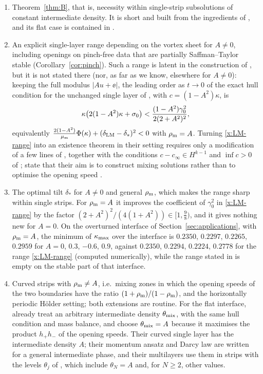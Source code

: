 \begin{enumerate}[label=\textup{(\roman*)},leftmargin=*]
\item Theorem~\ref{thm:B}, that is, necessity within single-strip subsolutions of constant intermediate density. It is short and built from the ingredients of \cite{LM26}, and its flat case is
contained in \cite[Sec.~3.2]{LM26}.
\item An explicit single-layer range depending on the vortex sheet for $A\ne0$, including openings on pinch-free data that are partially Saffman--Taylor stable (Corollary~\ref{cor:pinch}). Such a range is
latent in the construction of \cite{LM26}, but it is not stated there (nor, as far as we know, elsewhere for $A\ne0$): keeping the full modulus $|Au+\ee|$, the leading order as $t\to0$ of the
exact hull condition \cite[(4.14)]{LM26} for the unchanged single layer of \cite{LM26}, with $c=(1-A^2)\kappa$, is
\begin{equation}\label{x:LM-range}
\kappa\big(2(1-A^2)\kappa+\sigma_0\big)<\frac{(1-A^2)\gamma_0^2}{2(2+A^2)^2},
\end{equation}
equivalently $\frac{2(1-A^2)}{\mu_{\mathrm m}}\Phi(\kappa)+(\delta_{\rm LM}-\delta_*)^2<0$ with $\rho_{\mathrm m}=A$. Turning \eqref{x:LM-range} into an existence theorem in their setting requires only a modification of a few lines of
\cite[Sec.~7.4]{LM26}, together with the conditions $c-c_\infty\in H^{k-1}$ and $\inf c>0$ of \cite[Secs.~4.1 and~5]{LM26}; \cite{LM26} state that their aim is to construct mixing solutions rather than
to optimise the opening speed \cite[Sec.~7.5]{LM26}.
\item The optimal tilt $\delta_*$ for $A\ne0$ and general $\rho_{\mathrm m}$, which makes the range sharp within single strips. For $\rho_{\mathrm m}=A$ it improves the coefficient of $\gamma_0^2$ in \eqref{x:LM-range} by the
factor $(2+A^2)^2/(4(1+A^2))\in[1,\frac98)$, and it gives nothing new for $A=0$. On the overturned interface of Section~\ref{sec:applications}, with $\rho_{\mathrm m}=A$, the minimum of $\kappa_{\max}$ over the interface is
$0.2350$, $0.2297$, $0.2265$, $0.2959$ for $A=0$, $0.3$, $-0.6$, $0.9$, against $0.2350$, $0.2294$, $0.2224$, $0.2778$ for the range \eqref{x:LM-range} (computed numerically), while the range stated in
\cite{LM26} is empty on the stable part of that interface.
\item Curved strips with $\rho_{\mathrm m}\ne A$, i.e.\ mixing zones in which the opening speeds of the two boundaries have the ratio $(1+\rho_{\mathrm m})/(1-\rho_{\mathrm m})$, and the horizontally periodic H\"older setting; both
extensions are routine. For the flat interface, \cite[Sec.~3.2]{LM26} already treat an arbitrary intermediate density $\theta_{\rm mix}$, with the same hull condition and mass balance, and choose
$\theta_{\rm mix}=A$ because it maximises the product $h_+h_-$ of the opening speeds. Their curved single layer has the intermediate density $A$; their momentum ansatz and Darcy law
\cite[(4.6), (4.10)]{LM26} are written for a general intermediate phase, and their multilayers use them \cite[(7.17)]{LM26} in strips with the levels $\theta_j$ of \cite[(7.14)]{LM26}, which
include $\theta_N=A$ and, for $N\ge2$, other values.
\end{enumerate}
